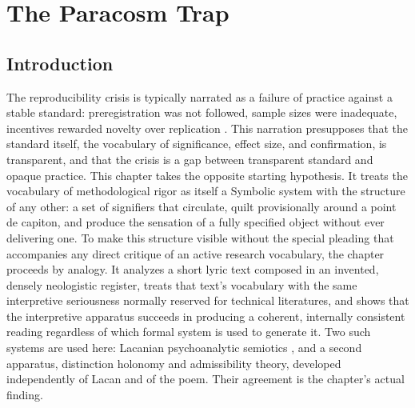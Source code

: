 
\chapter{The Paracosm Trap}
\label{ch:ch04-paracosm-trap}
\section{Introduction}

The reproducibility crisis is typically narrated as a failure of practice against a stable standard: preregistration was not followed, sample sizes were inadequate, incentives rewarded novelty over replication \cite{ioannidis2005,osc2015}. This narration presupposes that the standard itself, the vocabulary of significance, effect size, and confirmation, is transparent, and that the crisis is a gap between transparent standard and opaque practice. This chapter takes the opposite starting hypothesis. It treats the vocabulary of methodological rigor as itself a Symbolic system with the structure of any other: a set of signifiers that circulate, quilt provisionally around a point de capiton, and produce the sensation of a fully specified object without ever delivering one. To make this structure visible without the special pleading that accompanies any direct critique of an active research vocabulary, the chapter proceeds by analogy. It analyzes a short lyric text composed in an invented, densely neologistic register, treats that text's vocabulary with the same interpretive seriousness normally reserved for technical literatures, and shows that the interpretive apparatus succeeds in producing a coherent, internally consistent reading regardless of which formal system is used to generate it. Two such systems are used here: Lacanian psychoanalytic semiotics \cite{lacan1977}, and a second apparatus, distinction holonomy and admissibility theory, developed independently of Lacan and of the poem. Their agreement is the chapter's actual finding.

